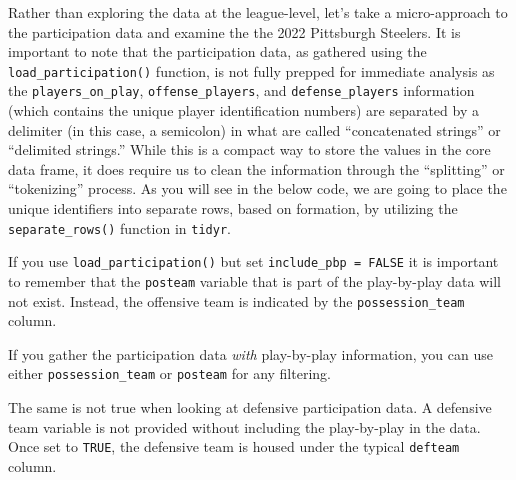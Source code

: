 \documentclass[
  letterpaper,
]{krantz}
\begin{document}
Rather than exploring the data at the league-level, let's take a
micro-approach to the participation data and examine the the 2022
Pittsburgh Steelers. It is important to note that the participation
data, as gathered using the \texttt{load\_participation()} function, is
not fully prepped for immediate analysis as the
\texttt{players\_on\_play}, \texttt{offense\_players}, and
\texttt{defense\_players} information (which contains the unique player
identification numbers) are separated by a delimiter (in this case, a
semicolon) in what are called ``concatenated strings'' or ``delimited
strings.'' While this is a compact way to store the values in the core
data frame, it does require us to clean the information through the
``splitting'' or ``tokenizing'' process. As you will see in the below
code, we are going to place the unique identifiers into separate rows,
based on formation, by utilizing the \texttt{separate\_rows()} function
in \texttt{tidyr}.

\begin{tcolorbox}[enhanced jigsaw, colback=white, leftrule=.75mm, breakable, colframe=quarto-callout-tip-color-frame, bottomtitle=1mm, rightrule=.15mm, left=2mm, opacityback=0, bottomrule=.15mm, arc=.35mm, coltitle=black, colbacktitle=quarto-callout-tip-color!10!white, toptitle=1mm, titlerule=0mm, title=\textcolor{quarto-callout-tip-color}{\faLightbulb}\hspace{0.5em}{Tip}, toprule=.15mm, opacitybacktitle=0.6]

If you use \texttt{load\_participation()} but set
\texttt{include\_pbp\ =\ FALSE} it is important to remember that the
\texttt{posteam} variable that is part of the play-by-play data will not
exist. Instead, the offensive team is indicated by the
\texttt{possession\_team} column.

If you gather the participation data \emph{with} play-by-play
information, you can use either \texttt{possession\_team} or
\texttt{posteam} for any filtering.

The same is not true when looking at defensive participation data. A
defensive team variable is not provided without including the
play-by-play in the data. Once set to \texttt{TRUE}, the defensive team
is housed under the typical \texttt{defteam} column.

\end{tcolorbox}
\end{document}
